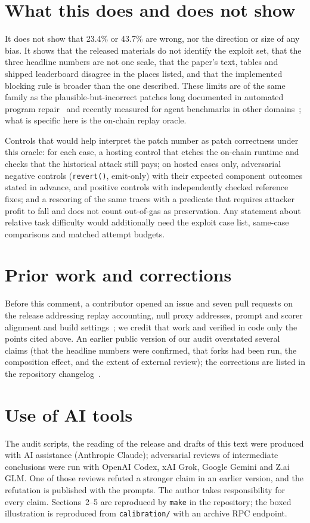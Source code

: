\documentclass[11pt]{article}
\newcommand{\code}[1]{\texttt{\small #1}}
\begin{document}
\section{What this does and does not show}
It does not show that 23.4\% or 43.7\% are wrong, nor the direction or size of any bias. It shows that the released materials do not identify the exploit set, that the three headline numbers are not one scale, that the paper's text, tables and shipped leaderboard disagree in the places listed, and that the implemented blocking rule is broader than the one described. These limits are of the same family as the plausible-but-incorrect patches long documented in automated program repair~\cite{qi2015,smith2015} and recently measured for agent benchmarks in other domains~\cite{patchbench,robobugbench}; what is specific here is the on-chain replay oracle.

Controls that would help interpret the patch number as patch correctness under this oracle: for each case, a hosting control that etches the on-chain runtime and checks that the historical attack still pays; on hosted cases only, adversarial negative controls (\code{revert()}, emit-only) with their expected component outcomes stated in advance, and positive controls with independently checked reference fixes; and a rescoring of the same traces with a predicate that requires attacker profit to fall and does not count out-of-gas as preservation. Any statement about relative task difficulty would additionally need the exploit case list, same-case comparisons and matched attempt budgets.

\section*{Prior work and corrections}
Before this comment, a contributor opened an issue and seven pull requests on the release addressing replay accounting, null proxy addresses, prompt and scorer alignment and build settings~\cite{moore}; we credit that work and verified in code only the points cited above. An earlier public version of our audit overstated several claims (that the headline numbers were confirmed, that forks had been run, the composition effect, and the extent of external review); the corrections are listed in the repository changelog~\cite{audit}.

\section*{Use of AI tools}
The audit scripts, the reading of the release and drafts of this text were produced with AI assistance (Anthropic Claude); adversarial reviews of intermediate conclusions were run with OpenAI Codex, xAI Grok, Google Gemini and Z.ai GLM. One of those reviews refuted a stronger claim in an earlier version, and the refutation is published with the prompts. The author takes responsibility for every claim. Sections~2--5 are reproduced by \code{make} in the repository; the boxed illustration is reproduced from \code{calibration/} with an archive RPC endpoint.
\end{document}
